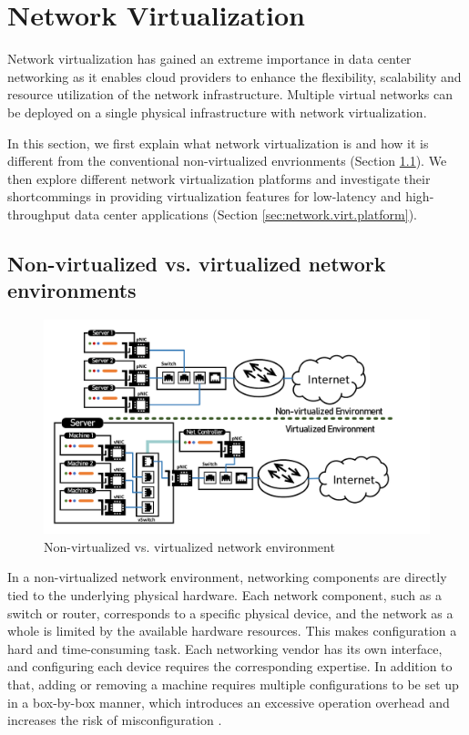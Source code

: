 \section{Network Virtualization}

Network virtualization has gained an extreme importance in data center networking
as it enables cloud providers to enhance the flexibility, scalability 
and resource utilization of the network infrastructure. Multiple virtual 
networks can be deployed on a single physical infrastructure with 
network virtualization. 

In this section, we first explain what network virtualization is and how it is 
different from the conventional non-virtualized envrionments 
(Section \ref{sec:nonvirt.vs.virt}). We then explore different network virtualization
platforms and investigate their shortcommings in providing virtualization features
for low-latency and high-throughput data center applications (Section \ref{sec:network.virt.platform}).


\subsection{Non-virtualized vs. virtualized network environments}
\label{sec:nonvirt.vs.virt}

\begin{figure}
    \centering
    \includegraphics[scale=0.625]{../Figures/non-virt-vs-virt.pdf}
    \caption{Non-virtualized vs. virtualized network environment}
    \label{fig:overhead.throughput}
\end{figure}



In a non-virtualized network environment, networking components are directly tied 
to the underlying physical hardware. Each network component, such as a switch or router, 
corresponds to a specific physical device, and the network as a whole is limited by the 
available hardware resources. This makes configuration a hard and 
time-consuming task. Each networking vendor has its own interface, and configuring each 
device requires the corresponding expertise. In addition to that, adding or removing a machine 
requires multiple configurations to be set up in a box-by-box manner, which introduces 
an excessive operation overhead and increases the risk of misconfiguration 
\cite{cearley2013top, marty2019snap}.


